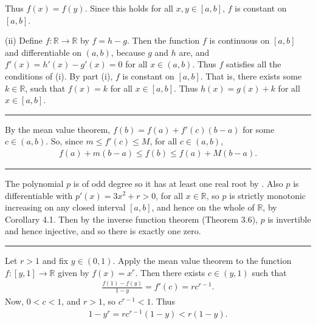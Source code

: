 \documentclass[letterpaper,10pt,english]{jupyterBook}
\begin{document}
\sphinxAtStartPar
Thus \(f(x)=f(y)\). Since this holds for all \(x,y\in [a,b]\), \(f\) is constant on \([a,b]\).

\sphinxAtStartPar
(ii) Define \(f:\mathbb{R}\to\mathbb{R}\) by \(f = h-g\). Then the function \(f\) is continuous on \([a,b]\) and differentiable on \((a,b)\), because \(g\) and \(h\) are, and \(f'(x)=h'(x)-g'(x)=0\) for all \(x\in (a,b)\). Thus \(f\) satisfies all the conditions of (i). By part (i), \(f\) is constant on \([a,b]\). That is, there exists some \(k\in \mathbb{R}\), such that \(f(x)=k\) for all \(x\in [a,b]\). Thus \(h(x)=g(x)+k\) for all \(x\in [a,b]\).


\bigskip\hrule\bigskip


\sphinxAtStartPar
{\hyperref[\detokenize{Problems:id50}]{}} By the mean value theorem, \(f(b) = f(a) + f'(c)(b - a)\) for some \(c\in (a,b)\). So, since \(m \leq f'(c) \leq M\), for all \(c \in (a, b)\),
\begin{equation*}
\begin{split}
f(a) + m(b - a) \leq f(b) \leq f(a) + M(b - a).
\end{split}
\end{equation*}

\bigskip\hrule\bigskip


\sphinxAtStartPar
{\hyperref[\detokenize{Problems:id51}]{}} The polynomial \(p\) is of odd degree so it has at least one real root by . Also \(p\) is differentiable with \(p'(x) = 3x^{2} + r > 0\), for all \(x \in \mathbb{R}\), so \(p\) is strictly monotonic increasing on any closed interval \([a, b]\), and hence on the whole of \(\mathbb{R}\), by Corollary 4.1. Then by the inverse function theorem (Theorem 3.6), \(p\) is invertible and hence injective, and so there is exactly one zero.


\bigskip\hrule\bigskip


\sphinxAtStartPar
{\hyperref[\detokenize{Problems:id52}]{}} Let \(r>1\) and fix \(y\in (0,1)\). Apply the mean value theorem to the function \(f:[y,1]\to\mathbb{R}\) given by \(f(x) = x^r\). Then there exists \(c \in (y, 1)\) such that
\begin{equation*}
\begin{split}
\frac{f(1)-f(y)}{1-y}=f'(c)=rc^{r-1}.
\end{split}
\end{equation*}
\sphinxAtStartPar
Now, \(0<c<1\), and \(r>1\), so \(c^{r-1}<1\). Thus
\begin{equation*}
\begin{split}
1 - y^r = rc^{r-1}( 1- y) < r(1 - y).
\end{split}
\end{equation*}
\end{document}
